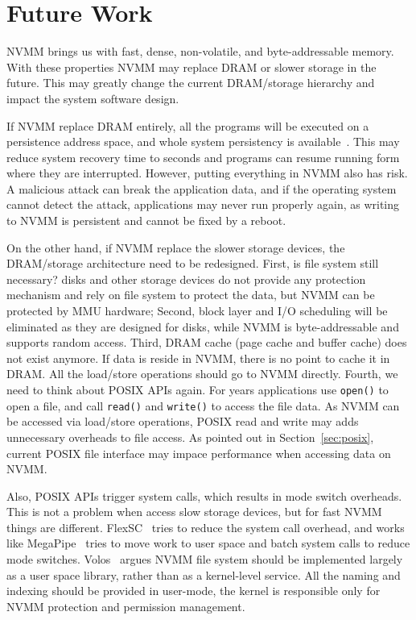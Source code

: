 \section{Future Work} 
\label{sec:future}

NVMM brings us with fast, dense,
non-volatile, and byte-addressable memory. With these properties NVMM may
replace DRAM or slower storage in the future.
This may greatly change the current DRAM/storage
hierarchy and impact the system software design.

If NVMM replace DRAM entirely, all the programs will be executed on a
persistence address space, and whole system persistency is available~\cite{WSP}.
This may reduce system recovery time to seconds and programs can resume
running form where they are interrupted. However, putting everything in
NVMM also has risk. A malicious attack can break the application data, and if
the operating system cannot detect the attack, applications may never run
properly again, as writing to NVMM is persistent and cannot be fixed by a reboot. 

On the other hand, if NVMM replace the slower storage devices, the DRAM/storage
architecture need to be redesigned. First, is file system still necessary?
disks and other storage devices do not provide any
protection mechanism and rely on file system to protect the data, but NVMM
can be protected by MMU hardware; Second, block layer and I/O scheduling
will be eliminated as they are designed for disks,
while NVMM is byte-addressable and supports random access.
Third, DRAM cache (page cache and buffer cache) does not exist anymore. If data
is reside in NVMM, there is no point to cache it in DRAM. All the load/store
operations should go to NVMM directly.
Fourth, we need to think about POSIX APIs again. For years applications use
\texttt{open()} to open a file, and call \texttt{read()} and \texttt{write()} to
access the file data. As NVMM can be accessed via load/store operations, 
POSIX read and write may adds unnecessary overheads to file access.
 As pointed out in Section~\ref{sec:posix}, current POSIX file 
interface may impace performance when accessing data on NVMM.

Also, POSIX APIs trigger system calls, which results in mode switch overheads.
This is not a problem when access slow storage devices, but for fast NVMM things
are different.
FlexSC~\cite{FlexSC} tries to reduce the system call overhead,
and works like MegaPipe~\cite{MegaPipe} tries to move work to user space and
batch system calls to reduce mode switches. Volos~\cite{system-scm} argues
NVMM file system should be implemented largely as a user space library, rather
than as a kernel-level service. All the naming and indexing should be provided
in user-mode, the kernel is responsible only for NVMM protection and permission
management.

